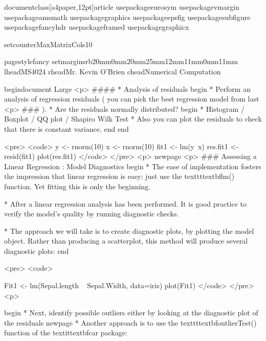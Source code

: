 documentclass[a4paper,12pt]{article}
usepackage{eurosym}
usepackage{vmargin}
usepackage{amsmath}
usepackage{graphics}
usepackage{epsfig}
usepackage{subfigure}
usepackage{fancyhdr}
usepackage{framed}
usepackage{graphicx}

setcounter{MaxMatrixCols}{10}

pagestyle{fancy}
setmarginsrb{20mm}{0mm}{20mm}{25mm}{12mm}{11mm}{0mm}{11mm}
lhead{MS4024} rhead{Mr. Kevin O'Brien}
chead{Numerical Computation}

begin{document}
Large
		<p>
####        * {Analysis of residuals}
		begin{ }
		        * 	Perform an analysis of regression residuals ( you can pick the best regression model from last <p>
### ).
		        * 	Are the residuals normally distributed?
		begin{ }
			         * Histogram /  Boxplot / QQ plot / Shapiro Wilk Test
			         * Also you can plot the residuals to check that there is constant variance.
		end{ }	
		end{ }
	
	<pre>
		<code>
		y <- rnorm(10)
		x <- rnorm(10)
		fit1 <- lm(y~x)
		res.fit1 <-  resid(fit1)
		plot(res.fit1)
		</code>
     </pre>
<p>		
newpage
<p>
### {Assessing a Linear Regression :  Model Diagnostics}
begin{ }
         * The ease of implementation fosters the impression that linear regression is easy: just use the texttt{textbf{lm()}} function. Yet fitting
this is only the beginning.

         * After a linear regression analysis has been performed. It is good practice to verify the model’s quality
by running diagnostic checks.

         * The approach we will take is to create diagnostic plots, by plotting the model object. Rather than producing a scatterplot, this method will produce several diagnostic plots:
end{ }


<pre>
<code>

Fit1 <- lm(Sepal.length ~ Sepal.Width, data=iris)
plot(Fit1)
</code> 
</pre>
<p>

begin{ }
         * Next, identify possible outliers either by looking at the diagnostic plot of the residuals
newpage
         * Another approach is to use the texttt{textbf{outlierTest()}} function of the textit{textbf{car}} package:

